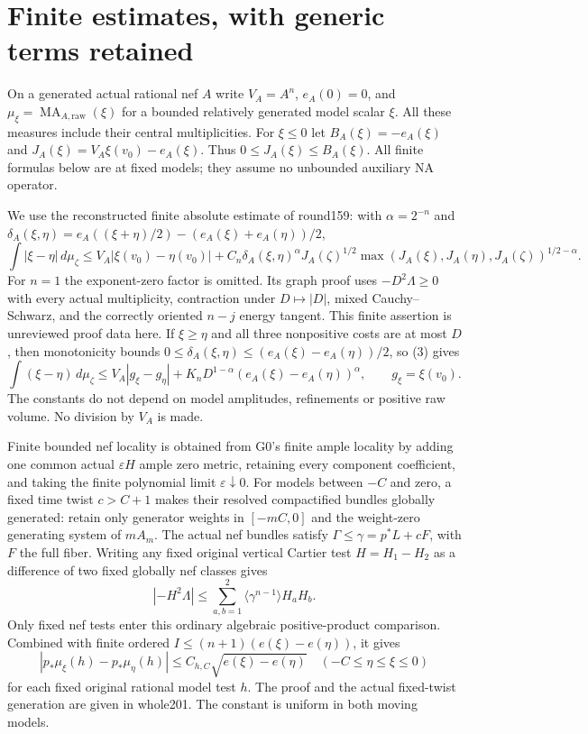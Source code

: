 \documentclass[11pt]{article}
\newcommand{\MA}{\operatorname{MA}}
\begin{document}
\section{Finite estimates, with generic terms retained}
On a generated actual rational nef $A$ write $V_A=A^n$,
$e_A(0)=0$, and $\mu_\xi=\MA_{A,\mathrm{raw}}(\xi)$ for a
bounded relatively generated model scalar $\xi$.
All these measures include their central multiplicities.
For $\xi\leq0$ let $B_A(\xi)=-e_A(\xi)$ and
$J_A(\xi)=V_A\xi(v_0)-e_A(\xi)$.
Thus $0\leq J_A(\xi)\leq B_A(\xi)$.
All finite formulas below are at fixed models; they assume no
unbounded auxiliary NA operator.

We use the reconstructed finite absolute estimate of round159:
with $\alpha=2^{-n}$ and
$\delta_A(\xi,\eta)=e_A((\xi+\eta)/2)-(e_A(\xi)+e_A(\eta))/2$,
\[
 \int|\xi-\eta|\,d\mu_\zeta
 \leq V_A|\xi(v_0)-\eta(v_0)|
   +C_n\delta_A(\xi,\eta)^\alpha
       J_A(\zeta)^{1/2}
       \max(J_A(\xi),J_A(\eta),J_A(\zeta))^{1/2-\alpha}.
                                                        \tag{3}
\]
For $n=1$ the exponent-zero factor is omitted.
Its graph proof uses $-D^2\Lambda\geq0$ with every actual
multiplicity, contraction under $D\mapsto|D|$, mixed
Cauchy--Schwarz, and the correctly oriented $n-j$ energy tangent.
This finite assertion is unreviewed proof data here.
If $\xi\geq\eta$ and all three nonpositive costs are at most $D$,
then monotonicity bounds
$0\leq\delta_A(\xi,\eta)\leq(e_A(\xi)-e_A(\eta))/2$,
so (3) gives
\[
 \int(\xi-\eta)\,d\mu_\zeta
 \leq V_A|g_\xi-g_\eta|
      +K_nD^{1-\alpha}(e_A(\xi)-e_A(\eta))^\alpha ,
 \qquad g_\xi=\xi(v_0).                                  \tag{4}
\]
The constants do not depend on model amplitudes, refinements or
positive raw volume. No division by $V_A$ is made.

Finite bounded nef locality is obtained from G0's finite ample
locality by adding one common actual $\varepsilon H$ ample
zero metric, retaining every component coefficient, and taking
the finite polynomial limit $\varepsilon\downarrow0$.
For models between $-C$ and zero, a fixed time twist $c>C+1$
makes their resolved compactified bundles globally generated:
retain only generator weights in $[-mC,0]$ and the weight-zero
generating system of $mA_m$.
The actual nef bundles satisfy
$\Gamma\leq\gamma=p^*L+cF$, with $F$ the full fiber.
Writing any fixed original vertical Cartier test $H=H_1-H_2$
as a difference of two fixed globally nef classes gives
\[
 |-H^2\Lambda|
 \leq\sum_{a,b=1}^2\langle\gamma^{n-1}\rangle H_aH_b.
                                                        \tag{5}
\]
Only fixed nef tests enter this ordinary algebraic
positive-product comparison. Combined with finite ordered
$I\leq(n+1)(e(\xi)-e(\eta))$, it gives
\[
 |p_*\mu_\xi(h)-p_*\mu_\eta(h)|
 \leq C_{h,C}\sqrt{e(\xi)-e(\eta)}
 \quad(-C\leq\eta\leq\xi\leq0)                            \tag{6}
\]
for each fixed original rational model test $h$.
The proof and the actual fixed-twist generation are given in
whole201. The constant is uniform in both moving models.
\end{document}

